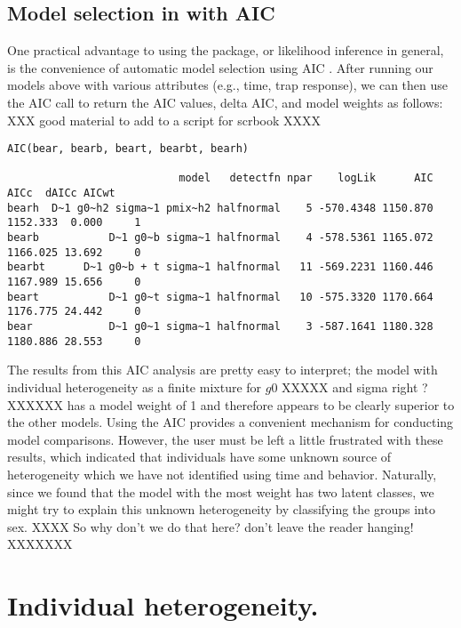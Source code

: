 \subsection{Model selection in \secr with AIC}

One practical advantage to using the \secr package, or likelihood
inference in general, is the convenience of automatic model selection
using AIC \citep{burnham_anderson:xxxxx}.
After running our models above with various attributes (e.g., time,
trap response), we can then use the AIC call to return the AIC values,
delta AIC, and model weights as follows: XXX good material to add to a
script for scrbook XXXX
{\small
\begin{verbatim}
AIC(bear, bearb, beart, bearbt, bearh)

                           model   detectfn npar    logLik      AIC     AICc  dAICc AICwt
bearh  D~1 g0~h2 sigma~1 pmix~h2 halfnormal    5 -570.4348 1150.870 1152.333  0.000     1
bearb           D~1 g0~b sigma~1 halfnormal    4 -578.5361 1165.072 1166.025 13.692     0
bearbt      D~1 g0~b + t sigma~1 halfnormal   11 -569.2231 1160.446 1167.989 15.656     0
beart           D~1 g0~t sigma~1 halfnormal   10 -575.3320 1170.664 1176.775 24.442     0
bear            D~1 g0~1 sigma~1 halfnormal    3 -587.1641 1180.328 1180.886 28.553     0
\end{verbatim}
}
The results from this AIC analysis are pretty easy to interpret; the model
with individual heterogeneity as a finite mixture for $g0$ XXXXX and
sigma right ?XXXXXX
 has a
model weight of 1 and therefore appears to be clearly superior to the
other models.  Using the AIC provides a convenient mechanism for
conducting model comparisons.  However, the user must be left a little
frustrated with these results, which indicated that individuals have
some unknown source of heterogeneity which we have not identified
using time and behavior.  Naturally, since we found that the model
with the most weight has two latent classes, we might try to explain
this unknown heterogeneity by classifying the groups into sex.
XXXX So why don't we do that here? don't leave the reader hanging! XXXXXXX




\section{Individual heterogeneity.}


